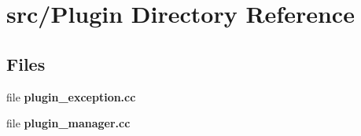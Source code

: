 \section{src/\+Plugin Directory Reference}
\label{dir_9f372f45c5e67e4b12d3096ca43257f3}
\subsection*{Files}
\begin{DoxyCompactItemize}
\item 
file {\bfseries plugin\+\_\+exception.\+cc}
\item 
file {\bfseries plugin\+\_\+manager.\+cc}
\end{DoxyCompactItemize}
